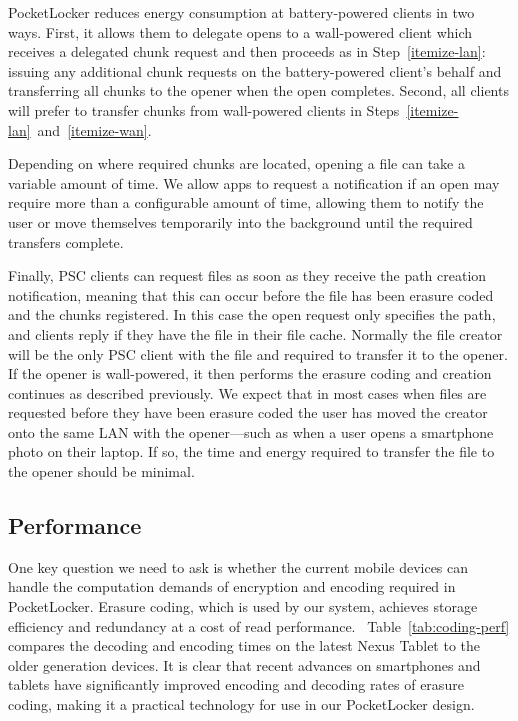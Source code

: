 PocketLocker reduces energy consumption at battery-powered clients in two
ways. First, it allows them to delegate opens to a wall-powered client which
receives a delegated chunk request and then proceeds as in
Step~\ref{itemize-lan}: issuing any additional chunk requests on the
battery-powered client's behalf and transferring all chunks to the opener when
the open completes. Second, all clients will prefer to transfer chunks from
wall-powered clients in Steps~\ref{itemize-lan}~and~\ref{itemize-wan}.

Depending on where required chunks are located, opening a file
can take a variable amount of time.  We allow apps
to request a notification if an open may require more than a configurable
amount of time, allowing them to notify the user or move themselves
temporarily into the background until the required transfers complete.

Finally, PSC clients can request files as soon as they receive the path
creation notification, meaning that this can occur before the file has been
erasure coded and the chunks registered. In this case the open request only
specifies the path, and clients reply if they have the file in their file
cache. Normally the file creator will be the only PSC client with the file
and required to transfer it to the opener. If the opener is wall-powered, it
then performs the erasure coding and creation continues as described
previously. We expect that in most cases when files are requested before they
have been erasure coded the user has moved the creator onto the same LAN with
the opener---such as when a user opens a smartphone photo on their laptop. If
so, the time and energy required to transfer the file to the opener should be
minimal.

\subsection{Performance} One key question we need to ask is whether the current
mobile devices can handle the computation demands of encryption and encoding
required in PocketLocker. Erasure coding, which is used by our system, achieves
storage efficiency and redundancy at a cost of read
performance.~\cite{cook2014compare} Table~\ref{tab:coding-perf} compares the
decoding and encoding times on the latest Nexus Tablet to the older generation
devices.  It is clear that recent advances on smartphones and tablets have
significantly improved encoding and decoding rates of erasure coding, making it
a practical technology for use in our PocketLocker design.

